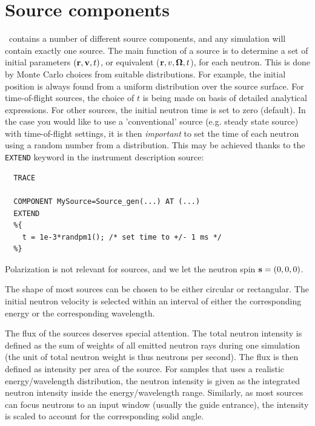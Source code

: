 
\chapter{Source components}
\label{c:source}

\MCS\ contains a number of different source components,
and any simulation will contain exactly one source.
The main function of a source is to determine a set of initial
parameters $({\bf r}, {\bf v}, t)$, or equivalent (${\bf r}, v, \mbox{\boldmath $\Omega$} , t $),
for each neutron. This is done by Monte Carlo choices from
suitable distributions. For example, the initial position is
always found from a uniform distribution over the source surface.
For time-of-flight sources, the choice of $t$ is being made on basis of
detailed analytical expressions.
For other sources, the initial neutron time is set to zero (default). In the case you would like to use a 'conventional' source (e.g. steady state source) with time-of-flight settings, it is then \emph{important} to set the time of each neutron using a random number from a distribution. This may be achieved thanks to the \verb+EXTEND+ keyword in the instrument description source:

\begin{verbatim}
  TRACE

  COMPONENT MySource=Source_gen(...) AT (...)
  EXTEND
  %{
    t = 1e-3*randpm1(); /* set time to +/- 1 ms */
  %}
\end{verbatim}

Polarization is not relevant for sources,
and we let the neutron spin ${\bf s}=(0,0,0)$.

The shape of most sources can be chosen to be either circular or rectangular.
The initial neutron velocity is selected within an interval
of either the corresponding energy or the corresponding wavelength.

The flux of the sources deserves special attention. The total neutron
intensity is defined as the sum of weights of all emitted neutron rays
during one simulation
(the unit of total neutron weight is thus neutrons per second).
The flux is then defined as intensity per area of the source.
For samples that uses a realistic energy/wavelength distribution,
the neutron intensity is given as the integrated neutron intensity
inside the energy/wavelength range. Similarly, as most sources can focus neutrons to an input window (usually the guide entrance), the intensity is scaled to account for the corresponding solid angle.

